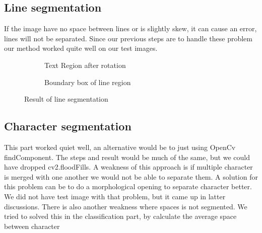 \documentclass[Report.tex]{subfiles}
\begin{document}
\subsection{Line segmentation}
If the image have no space between lines or is slightly skew, it can cause an error, lines will not be separated. Since our previous steps are to handle these problem our method worked quite well on our test images.
\begin{figure}[ht]
  \centering
  \begin{subfigure}[t]{6cm}
    \caption{Text Region after rotation}
  \end{subfigure}
  \hspace{2cm}%
  \begin{subfigure}[t]{6cm}
    \caption{Boundary box of line region}
  \end{subfigure}

  \caption{Result of line segmentation}
  \label{fig:result:rotation}
\end{figure}

\subsection{Character segmentation}
This part worked quiet well, an alternative would be to just using OpenCv findComponent. The steps and result would be much of the same, but we could have dropped cv2.floodFills. A weakness of this approach is if multiple character is merged with one another we would not be able to separate them. A solution for this problem can be to do a morphological opening to separate character better. We did not have test image with that problem, but it came up in latter discussions. There is also another weakness where spaces is not segmented. We tried to solved this in the classification part, by calculate the average space between character  
\end{document}

